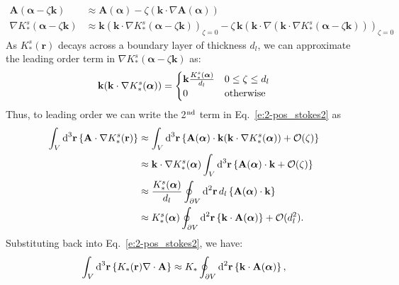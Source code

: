 \begin{align}
  \mathbf{A}(\bm{\alpha} - \zeta \mathbf{k}) &\approx \mathbf{A}(\bm{\alpha}) - \zeta (\mathbf{k} \cdot \nabla \mathbf{A}(\bm{\alpha})) \label{e:2-expandA} \\
  \nabla K_*^s(\bm{\alpha} - \zeta \mathbf{k}) &\approx \mathbf{k} (\mathbf{k} \cdot \nabla K_*^s(\bm{\alpha} - \zeta \mathbf{k}))_{\zeta = 0} - \zeta\, \mathbf{k}(\mathbf{k} \cdot \nabla (\mathbf{k} \cdot \nabla K_*^s(\bm{\alpha} - \zeta \mathbf{k})))_{\zeta = 0}
\end{align}
As $K_*^s(\mathbf{r})$ decays across a boundary layer of thickness $d_l$, we can approximate the leading order term in $\nabla K_*^s(\bm{\alpha} - \zeta \mathbf{k})$ as:
\begin{equation}
  \mathbf{k} (\mathbf{k} \cdot \nabla K_*^s(\bm{\alpha})) =
  \begin{cases}
    \mathbf{k}\frac{K_*^s(\bm{\alpha})}{d_l} & 0 \leq \zeta \leq d_l \\
    0 & \textup{otherwise}
  \end{cases}
\end{equation}
Thus, to leading order we can write the 2$^\textrm{\rm nd}$ term in Eq.~\ref{e:2-pos_stokes2} as
\begin{align}
  \int_{V} \textup{d}^3\mathbf{r} \left \{ \mathbf{A} \cdot \nabla K_{*}^s (\mathbf{r}) \right \} & \approx
  \int_{V} \textup{d}^3\mathbf{r} \left \{\mathbf{A}(\bm{\alpha}) \cdot \mathbf{k}(\mathbf{k} \cdot \nabla K_*^s(\bm{\alpha}))  + \mathcal{O}(\zeta) \right \} \\ & \approx
  \mathbf{k} \cdot \nabla K_*^s(\bm{\alpha}) \int_{V} \textup{d}^3\mathbf{r}\left \{\mathbf{A}(\bm{\alpha}) \cdot \mathbf{k} + \mathcal{O}(\zeta) \right \} \\ & \approx
  \frac{K_*^s(\bm{\alpha})}{d_l} \oint_{\partial V} \textup{d}^2\mathbf{r} \, d_l\left \{\mathbf{A}(\bm{\alpha}) \cdot \mathbf{k} \right \} \\ & \approx
  K_*^s(\bm{\alpha}) \oint_{\partial V} \textup{d}^2\mathbf{r}\left \{ \mathbf{k}  \cdot \mathbf{A}(\bm{\alpha}) \right \} + \mathcal{O}(d_l^2).
\end{align}
Substituting back into Eq.~\ref{e:2-pos_stokes2}, we have:
\begin{equation}
  \int_{V}\textup{d}^3\mathbf{r} \left \{ K_{*} (\mathbf{r}) \nabla \cdot \mathbf{A} \right \} \approx
  K_* \oint_{\partial V} \textup{d}^2\mathbf{r} \left \{ \mathbf{k} \cdot \mathbf{A}(\bm{\alpha})\right \},\label{e:2-positionF24}
\end{equation}
